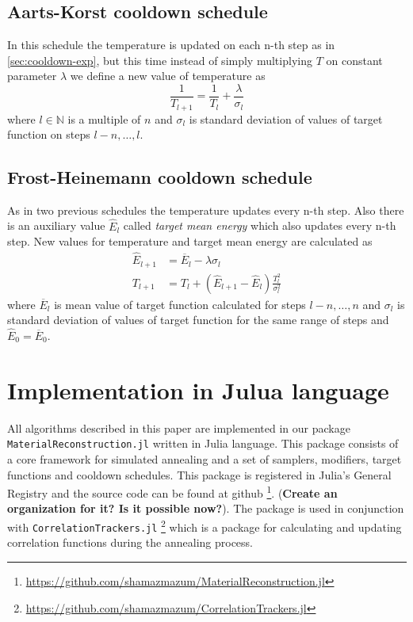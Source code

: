 \documentclass[preprint,amsmath,amssymb,aps,pre,nofootinbib]{revtex4-1}
\newcommand{\code}[1]{\colorbox{light-gray}{\texttt{#1}}}
\begin{document}
\subsection{Aarts-Korst cooldown schedule}
\label{sec:cooldown-aarts-korst}
In this schedule the temperature is updated on each n-th step as in
\cref{sec:cooldown-exp}, but this time instead of simply multiplying $T$ on
constant parameter $\lambda$ we define a new value of temperature as
\begin{equation*}
  \frac{1}{T_{l+1}} = \frac{1}{T_l} + \frac{\lambda}{\sigma_l}
\end{equation*}
where $l \in \mathbb{N}$ is a multiple of $n$ and $\sigma_{l}$ is standard
deviation of values of target function on steps $l-n, \dots, l$.

\subsection{Frost-Heinemann cooldown schedule}
\label{sec:cooldown-frost-heinemann}
As in two previous schedules the temperature updates every n-th step. Also there
is an auxiliary value $\hat{E}_l$ called \textit{target mean energy} which also
updates every n-th step. New values for temperature and target mean energy are
calculated as
\begin{align*}
  \hat{E}_{l+1} & = \overline{E}_l - \lambda \sigma_l \\
  T_{l+1} & = T_l + (\hat{E}_{l+1} - \hat{E}_l)\frac{T^2_l}{\sigma^2_l}
\end{align*}
where $\overline{E}_l$ is mean value of target function calculated for
steps $l-n,\dots,n$ and $\sigma_l$ is standard deviation of values of
target function for the same range of steps and $\hat{E}_0 = \overline{E}_0$.

\section{Implementation in Julua language}
\label{sec:julia-code}
All algorithms described in this paper are implemented in our package
\code{MaterialReconstruction.jl} written in Julia language. This package
consists of a core framework for simulated annealing and a set of samplers,
modifiers, target functions and cooldown schedules. This package is registered
in Julia's General Registry and the source code can be found at
github \footnote{\url{https://github.com/shamazmazum/MaterialReconstruction.jl}}.
(\textbf{Create an organization for it? Is it possible now?}). The package is
used in conjunction with
\code{CorrelationTrackers.jl} \footnote{\url{https://github.com/shamazmazum/CorrelationTrackers.jl}}
which is a package for calculating and updating correlation functions during the
annealing process.
\end{document}
